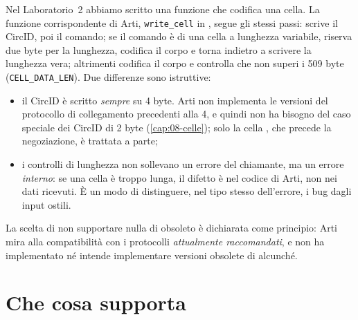 Nel Laboratorio~2 abbiamo scritto una funzione che codifica una cella. La funzione corrispondente di Arti, \texttt{write\_cell} in , segue gli stessi passi: scrive il CircID, poi il comando; se il comando è di una cella a lunghezza variabile, riserva due byte per la lunghezza, codifica il corpo e torna indietro a scrivere la lunghezza vera; altrimenti codifica il corpo e controlla che non superi i 509 byte (\texttt{CELL\_DATA\_LEN}). Due differenze sono istruttive:
\begin{itemize}
  \item il CircID è scritto \emph{sempre} su 4 byte. Arti non implementa le versioni del protocollo di collegamento precedenti alla 4, e quindi non ha bisogno del caso speciale dei CircID di 2 byte (\cref{cap:08-celle}); solo la cella , che precede la negoziazione, è trattata a parte;
  \item i controlli di lunghezza non sollevano un errore del chiamante, ma un errore \emph{interno}: se una cella è troppo lunga, il difetto è nel codice di Arti, non nei dati ricevuti. È un modo di distinguere, nel tipo stesso dell'errore, i bug dagli input ostili.
\end{itemize}
La scelta di non supportare nulla di obsoleto è dichiarata come principio: Arti mira alla compatibilità con i protocolli \emph{attualmente raccomandati}, e non ha implementato né intende implementare versioni obsolete di alcunché.

\section{Che cosa supporta}\label{sec:arti-supporto}

